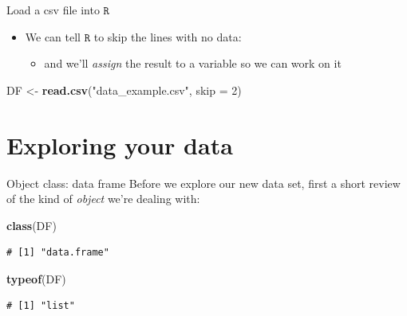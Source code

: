 \documentclass[
  11pt,
  ignorenonframetext,
]{beamer}
\newcommand{\VERB}{\Verb[commandchars=\\\{\}]}
\newenvironment{Shaded}{\begin{snugshade}}{\end{snugshade}}
\newcommand{\AttributeTok}[1]{\textcolor[rgb]{0.13,0.29,0.53}{#1}}
\newcommand{\DecValTok}[1]{\textcolor[rgb]{0.00,0.00,0.81}{#1}}
\newcommand{\FunctionTok}[1]{\textcolor[rgb]{0.13,0.29,0.53}{\textbf{#1}}}
\newcommand{\NormalTok}[1]{#1}
\newcommand{\OtherTok}[1]{\textcolor[rgb]{0.56,0.35,0.01}{#1}}
\newcommand{\StringTok}[1]{\textcolor[rgb]{0.31,0.60,0.02}{#1}}
\providecommand{\tightlist}{%
  \setlength{\itemsep}{0pt}\setlength{\parskip}{0pt}}
\newcommand{\R}{\texttt{R}}
\begin{document}
\begin{frame}[fragile]{Load a csv file into \(\R\)}
\protect\hypertarget{load-a-csv-file-into-r}{}
\begin{itemize}
\tightlist
\item
  We can tell \(\R\) to skip the lines with no data:

  \begin{itemize}
  \tightlist
  \item
    and we'll \emph{assign} the result to a variable so we can work on
    it
  \end{itemize}
\end{itemize}

\begin{Shaded}
\begin{Highlighting}[]
\NormalTok{DF }\OtherTok{\textless{}{-}} \FunctionTok{read.csv}\NormalTok{(}\StringTok{"data\_example.csv"}\NormalTok{, }\AttributeTok{skip =} \DecValTok{2}\NormalTok{)}
\end{Highlighting}
\end{Shaded}

\end{frame}

\hypertarget{exploring-your-data}{%
\section{Exploring your data}\label{exploring-your-data}}

\begin{frame}[fragile]{Object class: data frame}
\protect\hypertarget{object-class-data-frame}{}
Before we explore our new data set, first a short review of the kind of
\emph{object} we're dealing with:

\begin{Shaded}
\begin{Highlighting}[]
\FunctionTok{class}\NormalTok{(DF)}
\end{Highlighting}
\end{Shaded}

\begin{verbatim}
# [1] "data.frame"
\end{verbatim}

\begin{Shaded}
\begin{Highlighting}[]
\FunctionTok{typeof}\NormalTok{(DF)}
\end{Highlighting}
\end{Shaded}

\begin{verbatim}
# [1] "list"
\end{verbatim}
\end{frame}
\end{document}
